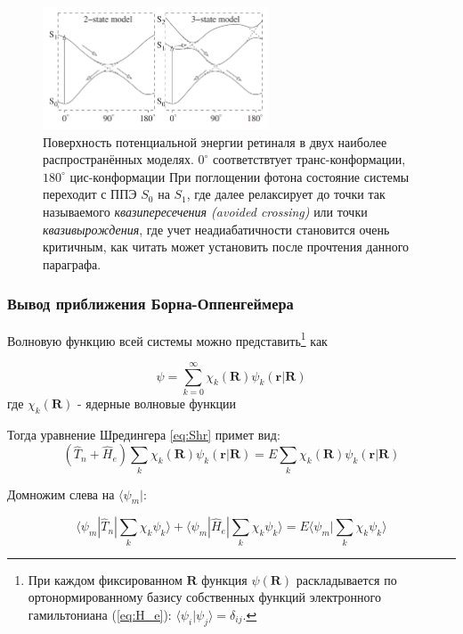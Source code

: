 \documentclass[12pt, oneside]{article}
\numberwithin{equation}{section}  %
\begin{document}
\begin{figure}[h] %
    \centering
    \includegraphics[width=0.6\textwidth]{./images/retinalePES.png}
    \caption{Поверхность потенциальной энергии ретиналя в двух наиболее распространённых моделях. \(0^{\circ}\) соответствтует транс-конформации, \(180^{\circ}\) цис-конформации При поглощении фотона состояние системы переходит с ППЭ \(S_0\) на \(S_1\), где далее релаксирует до точки так называемого \textit{квазипересечения (avoided crossing)} или точки \textit{квазивырождения}, где учет неадиабатичности становится очень критичным, как читать может установить после прочтения данного параграфа.}
    \label{fig:retinalePES}
\end{figure}

\subsubsection*{Вывод приближения Борна-Оппенгеймера}

Волновую функцию всей системы можно представить\footnote{При каждом фиксированном \(\bm{R}\) функция \(\psi(\bm{R})\) раскладывается по ортонормированному базису собственных функций электронного гамильтониана (\ref{eq:H_e}): \(\langle \psi_i | \psi_j \rangle = \delta_{ij}\).} как 

\begin{equation}
    \psi = \sum_{k=0}^{\infty} \chi_k (\bm{R}) \psi_k (\bm{r}| \bm{R})
\end{equation}
где \(\chi_k(\bm{R})\) - ядерные волновые функции


Тогда уравнение Шредингера \ref{eq:Shr} примет вид:
\begin{equation}
(\hat{T}_n + \hat{H}_e) \sum_k \chi_k (\bm{R}) \psi_k (\bm{r}| \bm{R}) = E \sum_k \chi_k (\bm{R}) \psi_k (\bm{r}| \bm{R})
\end{equation}

Домножим слева на \(\langle \psi_m|\):

\begin{equation}
\langle \psi_m | \hat{T}_n | \sum_k \chi_k \psi_k \rangle + \langle \psi_m | \hat{H}_e | \sum_k \chi_k \psi_k \rangle = E \langle \psi_m | \sum_k \chi_k \psi_k \rangle
\end{equation}
\end{document}
